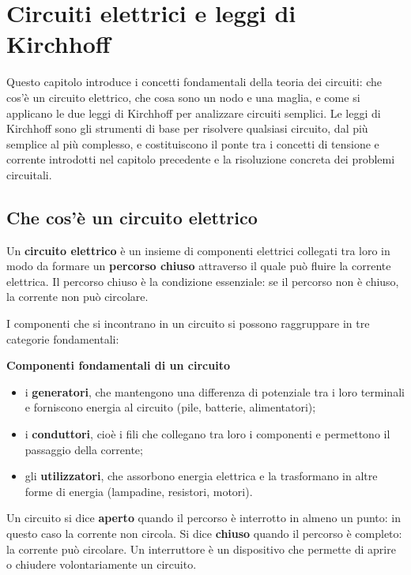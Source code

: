 \chapter{Circuiti elettrici e leggi di Kirchhoff}

\begin{concetto}
Questo capitolo introduce i concetti fondamentali della teoria dei circuiti: che cos'è un circuito elettrico, che cosa sono un nodo e una maglia, e come si applicano le due leggi di Kirchhoff per analizzare circuiti semplici. Le leggi di Kirchhoff sono gli strumenti di base per risolvere qualsiasi circuito, dal più semplice al più complesso, e costituiscono il ponte tra i concetti di tensione e corrente introdotti nel capitolo precedente e la risoluzione concreta dei problemi circuitali.
\end{concetto}

\section{Che cos'è un circuito elettrico}

Un \textbf{circuito elettrico} è un insieme di componenti elettrici collegati tra loro in modo da formare un \textbf{percorso chiuso} attraverso il quale può fluire la corrente elettrica. Il percorso chiuso è la condizione essenziale: se il percorso non è chiuso, la corrente non può circolare.

I componenti che si incontrano in un circuito si possono raggruppare in tre categorie fondamentali:

\begin{concetto}
\textbf{Componenti fondamentali di un circuito}
\begin{itemize}[leftmargin=1cm]
  \item i \textbf{generatori}, che mantengono una differenza di potenziale tra i loro terminali e forniscono energia al circuito (pile, batterie, alimentatori);
  \item i \textbf{conduttori}, cioè i fili che collegano tra loro i componenti e permettono il passaggio della corrente;
  \item gli \textbf{utilizzatori}, che assorbono energia elettrica e la trasformano in altre forme di energia (lampadine, resistori, motori).
\end{itemize}
\end{concetto}

Un circuito si dice \textbf{aperto} quando il percorso è interrotto in almeno un punto: in questo caso la corrente non circola. Si dice \textbf{chiuso} quando il percorso è completo: la corrente può circolare. Un interruttore è un dispositivo che permette di aprire o chiudere volontariamente un circuito.

